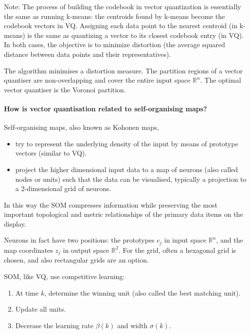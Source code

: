 Note: The process of building the codebook in vector quantization is essentially the same as running k-means: the centroids found by k-means become the codebook vectors in VQ.
Assigning each data point to the nearest centroid (in k-means) is the same as quantizing a vector to its closest codebook entry (in VQ).
In both cases, the objective is to minimize distortion (the average squared distance between data points and their representatives).

The algorithm minimises a distortion measure.
The partition regions of a vector quantiser are non-overlapping and cover the entire input space $\mathbb{R}^n$.
The optimal vector quantiser is the Voronoi partition.

\paragraph{How is vector quantisation related to self-organising maps?}

Self-organising maps, also known as Kohonen maps,

\begin{itemize}
    \item try to represent the underlying density of the input by means of prototype vectors (similar to VQ).
    \item project the higher dimensional input data to a map of neurons (also called nodes or units) such that the data can be visualised, typically a projection to a 2-dimensional grid of neurons.
\end{itemize}

In this way the SOM compresses information while preserving the most
important topological and metric relationships of the primary data items on
the display.

Neurons in fact have two positions: the prototypes $c_j$ in input space $\mathbb{R}^n$, and
the map coordinates $z_j$ in output space $\mathbb{R}^2$.
For the grid, often a hexagonal grid is chosen, and also rectangular grids are an option.

SOM, like VQ, use competitive learning:

\begin{enumerate}
    \item At time $k$, determine the winning unit (also called the best matching unit).
    \item Update all units.
    \item Decrease the learning rate $\beta(k)$ and width $\sigma(k)$.
\end{enumerate}

